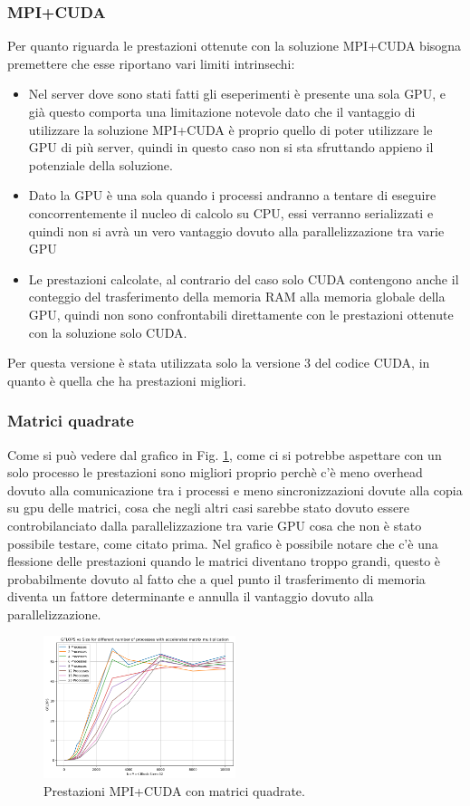 \documentclass[conference]{IEEEtran}
\begin{document}
\subsubsection{MPI+CUDA}
Per quanto riguarda le prestazioni ottenute con la soluzione MPI+CUDA bisogna premettere che esse riportano vari limiti intrinsechi:
\begin{itemize}
    \item Nel server dove sono stati fatti gli eseperimenti è presente una sola GPU, e già questo comporta una limitazione notevole dato che il vantaggio di utilizzare la soluzione MPI+CUDA è proprio quello di poter utilizzare le GPU di più server, quindi in questo caso non si sta sfruttando appieno il potenziale della soluzione.
    \item Dato la GPU è una sola quando i processi andranno a tentare di eseguire concorrentemente il nucleo di calcolo su CPU, essi verranno serializzati e quindi non si avrà un vero vantaggio dovuto alla parallelizzazione tra varie GPU
    \item Le prestazioni calcolate, al contrario del caso solo CUDA contengono anche il conteggio del trasferimento della memoria RAM alla memoria globale della GPU, quindi non sono confrontabili direttamente con le prestazioni ottenute con la soluzione solo CUDA.
\end{itemize}
Per questa versione è stata utilizzata solo la versione 3 del codice CUDA, in quanto è quella che ha prestazioni migliori.
\subsubsection{Matrici quadrate}
Come si può vedere dal grafico in Fig. \ref{fig:mpi_cuda_square}, come ci si potrebbe aspettare con un solo processo le prestazioni sono migliori proprio perchè c'è meno overhead dovuto alla comunicazione tra i processi e meno sincronizzazioni dovute alla copia su gpu delle matrici, cosa che negli altri casi sarebbe stato dovuto essere controbilanciato dalla parallelizzazione tra varie GPU cosa che non è stato possibile testare, come citato prima. 
Nel grafico è possibile notare che c'è una flessione delle prestazioni quando le matrici diventano troppo grandi, questo è probabilmente dovuto al fatto che a quel punto il trasferimento di memoria diventa un fattore determinante e annulla il vantaggio dovuto alla parallelizzazione.
\begin{figure}[H]
    \centering
    \includegraphics[width=0.5\textwidth]{resources/mpi_cuda_square.png}
    \caption{Prestazioni MPI+CUDA con matrici quadrate.}
    \label{fig:mpi_cuda_square}
\end{figure}
\end{document}
